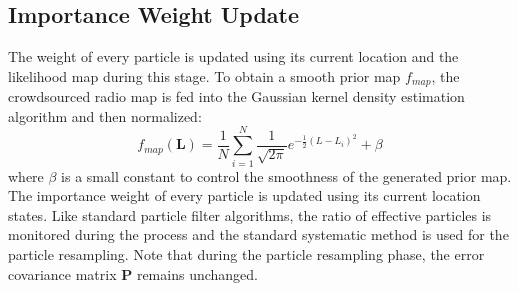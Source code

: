 \subsection{Importance Weight Update} 
\label{sub:importance}
The weight of every particle is updated using its current location and the
likelihood map during this stage. To obtain a smooth prior map $f_{map}$, the crowdsourced radio map is fed into the Gaussian kernel density estimation algorithm \cite{silverman2018density} and then normalized:
\begin{equation}
f_{map}(\mathbf{L}) = \frac{1}{N} \sum_{i=1}^{N} \frac{1}{\sqrt{2\pi}} e^{-\frac{1}{2} \left( {L - L_i} \right)^2} + \beta
\end{equation}
where $\beta$ is a small constant to control the smoothness of the generated prior map.
The importance weight of every particle is updated using its current location states.
Like standard particle filter algorithms, the ratio of effective particles is monitored during the process and the standard systematic method \cite{doucet2001sequential} is used for the particle resampling. Note that during the particle resampling phase, the error covariance matrix \( \mathbf{P} \) remains unchanged.





